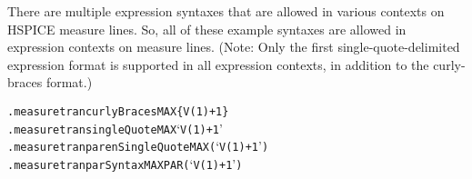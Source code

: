 There are multiple expression syntaxes that are allowed in various
contexts on HSPICE measure lines.  So, all of these example syntaxes
are allowed in expression contexts on \Xyce{} measure lines.  (Note:
Only the first single-quote-delimited expression format is supported
in all \Xyce{} expression contexts, in addition to the \Xyce{}
curly-braces format.)
\begin{alltt}
.measure tran curlyBraces MAX \{V(1)+1\}
.measure tran singleQuote MAX `V(1)+1'
.measure tran parenSingleQuote MAX (`V(1)+1')
.measure tran parSyntax MAX PAR(`V(1)+1')
\end{alltt}


